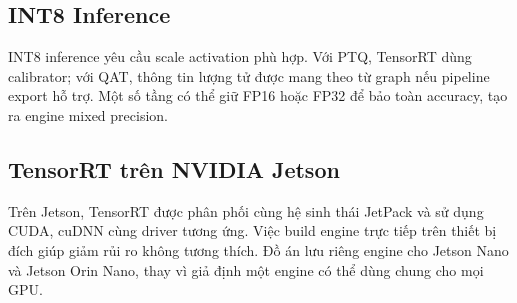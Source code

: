 \subsection{INT8 Inference}

INT8 inference yêu cầu scale activation phù hợp. Với PTQ, TensorRT dùng
calibrator; với QAT, thông tin lượng tử được mang theo từ graph nếu pipeline
export hỗ trợ. Một số tầng có thể giữ FP16 hoặc FP32 để bảo toàn accuracy, tạo ra
engine mixed precision.

\subsection{TensorRT trên NVIDIA Jetson}

Trên Jetson, TensorRT được phân phối cùng hệ sinh thái JetPack và sử dụng CUDA,
cuDNN cùng driver tương ứng. Việc build engine trực tiếp trên thiết bị đích giúp
giảm rủi ro không tương thích. Đồ án lưu riêng engine cho Jetson Nano và Jetson
Orin Nano, thay vì giả định một engine có thể dùng chung cho mọi GPU.